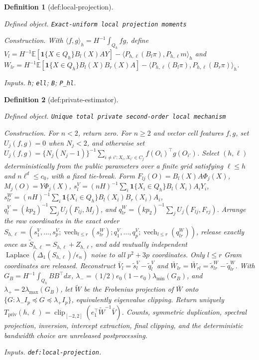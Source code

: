 \documentclass{article}
\newtheorem{definition}{Definition}
\begin{document}
\begin{definition}[def:local-projection]\label{def:local-projection}
\par\smallskip\noindent\emph{Defined object.} \texttt{Exact-\allowbreak{}uniform local projection moments}
\par\smallskip\noindent\emph{Construction.} With \(\langle f,g\rangle_h=H^{-1}\int_{Q_h}fg\), define \(V_l=H^{-1}\mathbb E[\mathbf 1\{X\in Q_h\}B_l(X)AY]-\langle P_{h,\ell}(B_l\pi),P_{h,\ell}m\rangle_h\) and \(W_{lr}=H^{-1}\mathbb E[\mathbf 1\{X\in Q_h\}B_l(X)B_r(X)A]-\langle P_{h,\ell}(B_l\pi),P_{h,\ell}(B_r\pi)\rangle_h\).
\par\smallskip\noindent\emph{Inputs.} \texttt{h}; \texttt{ell}; \texttt{B}; \texttt{P\_\allowbreak{}hl}.
\end{definition}

\begin{definition}[def:private-estimator]\label{def:private-estimator}
\par\smallskip\noindent\emph{Defined object.} \texttt{Unique total private second-\allowbreak{}order local mechanism}
\par\smallskip\noindent\emph{Construction.} For \(n<2\), return zero. For \(n\ge2\) and vector cell features \(f,g\), set \(U_j(f,g)=0\) when \(N_j<2\), and otherwise set \(U_j(f,g)=\{N_j(N_j-1)\}^{-1}\sum_{i\ne i':X_i,X_{i'}\in C_j}f(O_i)^\top g(O_{i'})\). Select \((h,\ell)\) deterministically from the public parameters over a finite grid satisfying \(\ell\le h\) and \(n\ell^d\le c_0\), with a fixed tie-break. Form \(F_{lj}(O)=B_l(X)A\Phi_j(X)\), \(M_j(O)=Y\Phi_j(X)\), \(s_l^V=(nH)^{-1}\sum_i\mathbf 1\{X_i\in Q_h\}B_l(X_i)A_iY_i\), \(s_{lr}^W=(nH)^{-1}\sum_i\mathbf 1\{X_i\in Q_h\}B_l(X_i)B_r(X_i)A_i\), \(q_l^V=(kp_2)^{-1}\sum_jU_j(F_{lj},M_j)\), and \(q_{lr}^W=(kp_2)^{-1}\sum_jU_j(F_{lj},F_{rj})\). Arrange the raw coordinates in the exact order \(S_{h,\ell}=(s_1^V,\ldots,s_p^V;\operatorname{vech}_{l\le r}(s_{lr}^W);q_1^V,\ldots,q_p^V;\operatorname{vech}_{l\le r}(q_{lr}^W))\), release exactly once as \(\widetilde S_{h,\ell}=S_{h,\ell}+Z_{h,\ell}\), and add mutually independent \(\operatorname{Laplace}(\Delta_1(S_{h,\ell})/\epsilon_n)\) noise to all \(p^2+3p\) coordinates. Only \(l\le r\) Gram coordinates are released. Reconstruct \(\bar V_l=\widetilde s_l^V-\widetilde q_l^V\) and \(\bar W_{lr}=\bar W_{rl}=\widetilde s_{lr}^W-\widetilde q_{lr}^W\). With \(G_B=H^{-1}\int_{Q_h}BB^\top dx\), \(\lambda_-=(1/2)e_0(1-e_0)\lambda_{\min}(G_B)\), and \(\lambda_+=2\lambda_{\max}(G_B)\), let \(\widetilde W\) be the Frobenius projection of \(\bar W\) onto \(\{G:\lambda_-I_p\preceq G\preceq\lambda_+I_p\}\), equivalently eigenvalue clipping. Return uniquely \(T_{\mathrm{priv}}(h,\ell)=\operatorname{clip}_{[-2,2]}(e_1^\top\widetilde W^{-1}\bar V)\). Counts, symmetric duplication, spectral projection, inversion, intercept extraction, final clipping, and the deterministic bandwidth choice are unreleased postprocessing.
\par\smallskip\noindent\emph{Inputs.} \texttt{def:\allowbreak{}local-\allowbreak{}projection}.
\end{definition}
\end{document}
